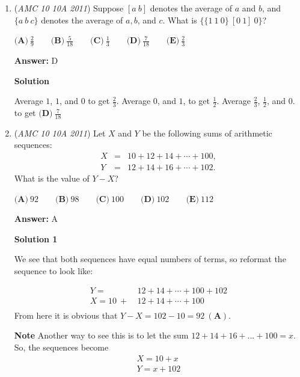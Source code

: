 \begin{enumerate}
\textbf{Solution 2}

We double $35$ to get $70.$ We see that $70\cdot7=490,$ which is very close to $500.$ Thus, $2\cdot7+1=\boxed{\text{(E)} 15}$ bottles are enough. ~Technodoggo

 


	\item (\textit{AMC 10 10A 2011}) Suppose $[a\ b]$ denotes the average of $a$ and $b$, and $\{a\ b\ c\}$ denotes the average of $a, b$, and $c$. What is $\{\{1\ 1\ 0\}\ [0\ 1]\ 0\}$?


 $\textbf{(A)}\ \frac{2}{9} \qquad\textbf{(B)}\ \frac{5}{18} \qquad\textbf{(C)}\ \frac{1}{3} \qquad\textbf{(D)}\ \frac{7}{18} \qquad\textbf{(E)}\ \frac{2}{3}$

 \textbf{Answer: }D



\textbf{Solution}

Average $1$, $1$, and $0$ to get $\frac23$. Average $0$, and $1$, to get $\frac12$. Average $\frac23$, $\frac12$, and $0$. to get $\boxed{\textbf{(D)}\ \frac7{18}}$



	\item (\textit{AMC 10 10A 2011}) Let $X$ and $Y$ be the following sums of arithmetic sequences: 
 \begin{eqnarray*} X &=& 10 + 12 + 14 + \cdots + 100, \\ Y &=& 12 + 14 + 16 + \cdots + 102. \end{eqnarray*} What is the value of $Y - X$?


 $\textbf{(A)}\ 92\qquad\textbf{(B)}\ 98\qquad\textbf{(C)}\ 100\qquad\textbf{(D)}\ 102\qquad\textbf{(E)}\ 112$

 \textbf{Answer: }A



\textbf{Solution 1}

We see that both sequences have equal numbers of terms, so reformat the sequence to look like: 

 
 \begin{align*} Y = \ &12 + 14 + \cdots + 100 + 102\\ X = 10 \ + \ &12 +  14 + \cdots + 100\\ \end{align*}
From here it is obvious that $Y - X = 102 - 10 = \boxed{92 \ \mathbf{(A)}}$.

 \textbf{Note} Another way to see this is to let the sum $12+14+16+...+100=x.$ So, the sequences become
 \begin{align*} X = 10+x \\ Y= x+102 \\ \end{align*}



\end{enumerate}
